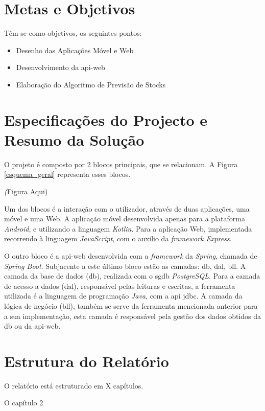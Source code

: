 %
%
\section{Metas e Objetivos} \label{sec12}
Têm-se como objetivos, os seguintes pontos:
\begin{itemize} \itemsep 0pt
	\item Desenho das Aplicações Móvel e Web
	\item Desenvolvimento da \gls{api-web}
	\item Elaboração do Algoritmo de Previsão de Stocks
\end{itemize}


%
%
\section{Especificações do Projecto e Resumo da Solução} \label{sec13}

O projeto é composto por 2 blocos principais, que se relacionam. A Figura \ref{esquema_geral} representa esses blocos. 

\textit(Figura Aqui)

Um dos blocos é a interação com o utilizador, através de duas aplicações, uma móvel e uma Web. A aplicação móvel desenvolvida apenas para a plataforma \textit{Android}, e utilizando a linguagem \textit{Kotlin}. Para a aplicação Web, implementada recorrendo à linguagem \textit{JavaScript}, com o auxilio da \textit{framework Express}. 

O outro bloco é a \gls{api-web} desenvolvida com a \textit{framework} da \textit{Spring}, chamada de \textit{Spring Boot}. Subjacente a este último bloco estão as camadas: \acrfull{db}, \acrfull{dal}, \acrfull{bll}.  A camada da base de dados (\acrshort{db}), realizada com o \acrfull{sgdb} \textit{PostgreSQL}. Para a camada de acesso a dados (\acrshort{dal}), responsável pelas leituras e escritas, a ferramenta utilizada é a linguagem de programação \textit{Java}, com a \gls{api} \acrfull{jdbc}. A camada da lógica de negócio (\acrshort{bll}), também se serve da ferramenta mencionada anterior para a sua implementação, esta camada é responsável pela gestão dos dados obtidos da \acrshort{db} ou da \gls{api-web}.


%
%
\section{Estrutura do Relatório} \label{sec14}
O relatório está estruturado em X capítulos.

O capítulo 2 
